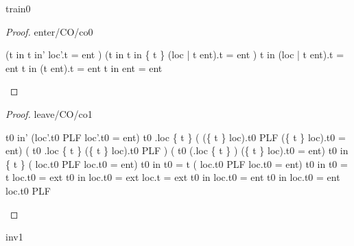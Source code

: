 \documentclass[12pt]{amsart}
\begin{document}
\begin{machine}{train0}
\begin{proof}{enter/CO/co0}
	\begin{calculation}
	\hint{=}{  }
	\hint{=}{ }
	\land	{}
	\hint{=}{ }
		(\neg t \in in \land t \in in' \implies  loc'.t = ent )
	\land	{}
		(\neg t \in in \land t \in in \bunion \{ t \} \implies  (loc | t \tfun ent).t = ent )
	\land	{}
	\hint{=}{  }
		\neg t \in in \implies  (loc | t \tfun ent).t = ent 
	\hint{=}{  }
		\neg t \in in \implies  (t \tfun ent).t = ent 
	\hint{=}{  }
		\neg t \in in \implies  ent = ent 
	\hint{=}{  }
		\true
	\end{calculation}
\end{proof}

\begin{proof}{leave/CO/co1}
	\begin{calculation}
		t0 \in in' \land (loc'.t0 \in PLF \lor loc'.t0 = ent)
		t0 \in \dom.loc \setminus \{ t \} 
		\land ( (\{ t \} \domsub loc).t0 \in PLF \lor (\{ t \} \domsub loc).t0 = ent)
	\hint{=}{ }	%
		( t0 \in \dom.loc \setminus \{ t \} 
		\land  (\{ t \} \domsub loc).t0 \in PLF )
		\lor ( t0 \in (\dom.loc \setminus \{ t \} )
		\land (\{ t \} \domsub loc).t0 = ent)
	\hint{=}{ }	%
		t0 \in in \setminus \{ t \} 
		\land ( loc.t0 \in PLF \lor  loc.t0 = ent)
	\hint{=}{ } %
		t0 \in in \land \neg t0  = t 
		\land ( loc.t0 \in PLF \lor  loc.t0 = ent)
	\hint{=}{  } %
		t0 \in in \land \neg t0  = t \land \neg loc.t0 = ext
	\hint{=}{  \ref{grd0} } %
	 	t0 \in in \land \neg loc.t0 = ext \land loc.t = ext
	\hint{\follows}{  \ref{grd0} } %
	 	t0 \in in \land loc.t0 = ent 
	\hint{=}{   } %
	 	t0 \in in \land loc.t0 = ent  \land \neg loc.t0 \in PLF 
	\end{calculation}
\end{proof}

\begin{invariant}{inv1}
\end{invariant}


\end{machine}
\end{document}
